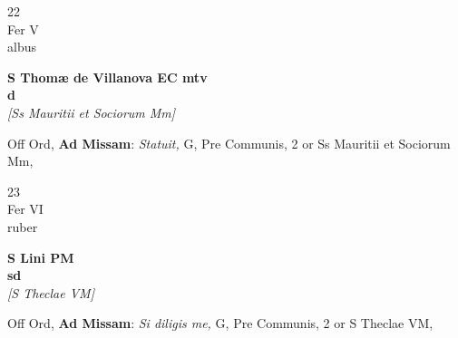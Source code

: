 \documentclass[10pt, openany]{book}
\begin{document}
        \begin{center}
            \begin{minipage}{3.5in}
                \vspace{2em}
                \begin{minipage}{0.5in}
                    {\Huge 22} \\
                    {\normalsize Fer V} \\
                    {\normalsize albus}
                \end{minipage}
                \begin{minipage}{3.0in}
                    \textbf{ \large S Thomæ de Villanova EC mtv \\
                    \textnormal{\normalsize d}} \\ \textit{[Ss Mauritii et Sociorum Mm]} \\ 
                \end{minipage}
                \begin{justify}Off Ord, \textbf{Ad Missam}: \textit{Statuit,} G, Pre Communis, 2 or Ss Mauritii et Sociorum Mm,   
                \end{justify}
            \end{minipage}
        \end{center}
    
        \begin{center}
            \begin{minipage}{3.5in}
                \vspace{2em}
                \begin{minipage}{0.5in}
                    {\Huge 23} \\
                    {\normalsize Fer VI} \\
                    {\normalsize ruber}
                \end{minipage}
                \begin{minipage}{3.0in}
                    \textbf{ \large S Lini PM \\
                    \textnormal{\normalsize sd}} \\ \textit{[S Theclae VM]} \\ 
                \end{minipage}
                \begin{justify}Off Ord, \textbf{Ad Missam}: \textit{Si diligis me,} G, Pre Communis, 2 or S Theclae VM,   
                \end{justify}
            \end{minipage}
        \end{center}
    
\end{document}

